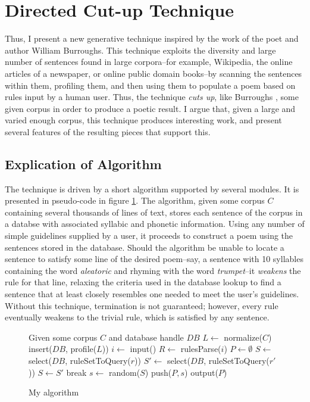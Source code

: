 \documentclass[10pt]{article}
\begin{document}
\section{Directed Cut-up Technique}
Thus, I present a new generative technique inspired by the work of the poet and
author William Burroughs. This technique exploits the diversity and large
number of sentences found in large corpora--for example, Wikipedia, the online
articles of a newspaper, or online public domain books--by scanning the
sentences within them, profiling them, and then using them to populate a poem
based on rules input by a human user. Thus, the technique \emph{cuts up}, like
Burroughs \cite{wikiCutup}, some given corpus in order to produce a poetic
result. I argue that, given a large and varied enough corpus, this technique
produces interesting work, and present several features of the resulting pieces
that support this.

\subsection{Explication of Algorithm}
The technique is driven by a short algorithm  supported by several modules. It
is presented in pseudo-code in figure \ref{fig:algorithm}. The algorithm, given some corpus $C$
containing several thousands of lines of text, stores each sentence of the
corpus in a databse with associated syllabic and phonetic information. Using
any number of simple guidelines supplied by a user, it proceeds to construct a
poem using the sentences stored in the database. Should the algorithm be unable
to locate a sentence to satisfy some line of the desired poem--say, a sentence with
10 syllables containing the word \emph{aleatoric} and rhyming with the word
\emph{trumpet}--it \emph{weakens} the rule for that line, relaxing the criteria
used in the database lookup to find a sentence that at least closely resembles
one needed to meet the user's guidelines. Without this technique, termination
is not guaranteed; however, every rule eventually weakens to the trivial rule,
which is satisfied by any sentence.

\pagebreak
\onehalfspacing
\begin{figure}[here]
\begin{algorithmic}
\STATE Given some corpus $C$ and database handle $DB$
\STATE $L\gets$ normalize($C$)
\STATE insert($DB$, profile($L$))
\STATE $i \gets$ input()
\STATE $R \gets$ rulesParse($i$) 
\STATE $P \gets \emptyset$ 
    \STATE $S \gets$ select($DB$, ruleSetToQuery($r$))
            \STATE $S\prime \gets$ select($DB$, ruleSetToQuery($r\prime$))
                \STATE $S \gets S\prime$
                \STATE break
            \ENDIF
        \ENDWHILE
    \ENDIF
    \STATE $s \gets$ random($S$)
    \STATE push($P, s$)
\ENDFOR
\STATE output($P$)
\end{algorithmic}
\caption{My algorithm}
\label{fig:algorithm}
\end{figure}
\doublespacing
\end{document}
